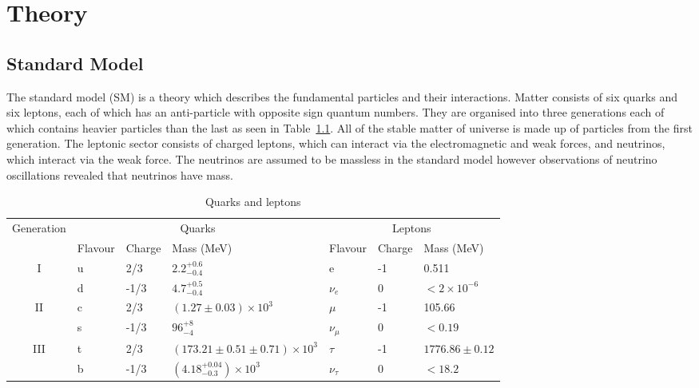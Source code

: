 \chapter{Theory}
\label{c:theory}

\section{Standard Model}

The standard model (SM) is a theory which describes the fundamental particles and their interactions. Matter consists of six quarks and six leptons, each of which has an anti-particle with opposite sign quantum numbers. They are organised into three generations each of which contains heavier particles than the last as seen in Table~\ref{table:SMmatter}. All of the stable matter of universe is made up of particles from the first generation. The leptonic sector consists of charged leptons, which can interact via the electromagnetic and weak forces, and neutrinos, which interact via the weak force. The neutrinos are assumed to be massless in the standard model however observations of neutrino oscillations revealed that neutrinos have mass.

\begin{table}[ht!]
\centering
\caption{Quarks and leptons}
\label{table:SMmatter}
\footnotesize
\begin{tabular}{|c|l|l|l|l|l|l|}
\hline
\multirow{2}{*}{Generation} & \multicolumn{3}{c|}{Quarks}                             & \multicolumn{3}{c|}{Leptons}              \\ \cline{2-7} 
                            & Flavour & Charge & Mass (MeV)                           & Flavour      & Charge & Mass (MeV)        \\ \hline
\hline

\multirow{2}{*}{I}          & u       & 2/3    & $2.2^{+0.6}_{-0.4}$                  & e            & -1     & 0.511             \\
                            & d       & -1/3   & $4.7^{+0.5}_{-0.4}$                  & $\nu_{e}$    & 0      & $<2\times10^{-6}$ \\ \hline
\multirow{2}{*}{II}         & c       & 2/3    & $(1.27\pm 0.03)\times10^{3}$         & $\mu$        & -1     & 105.66            \\
                            & s       & -1/3   & $96^{+8}_{-4}$                       & $\nu_{\mu}$  & 0      & $<0.19$           \\ \hline
\multirow{2}{*}{III}        & t       & 2/3    & $(173.21\pm0.51\pm0.71)\times10^{3}$ & $\tau$       & -1     & $1776.86\pm0.12$  \\
                            & b       & -1/3   & $(4.18^{+0.04}_{-0.3})\times10^{3}$  & $\nu_{\tau}$ & 0      & $<18.2$           \\ \hline
\end{tabular}
\end{table}


